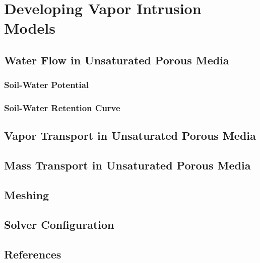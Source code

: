 \documentclass[../thesis.tex]{subfiles}
\begin{document}
\chapter{Developing Vapor Intrusion Models}






\section{Water Flow in Unsaturated Porous Media}

\subsection{Soil-Water Potential}

\subsection{Soil-Water Retention Curve}


\section{Vapor Transport in Unsaturated Porous Media}


\section{Mass Transport in Unsaturated Porous Media}




\section{Meshing}

\section{Solver Configuration}


\section{References}
\end{document}
